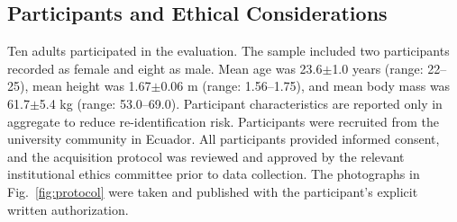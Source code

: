 \documentclass[conference]{IEEEtran}
\newcommand{\CC}[1]{\textcolor{blue}{#1}}
\begin{document}
\begin{table}[t]
\caption{\CC{Controlled posture acquisition protocol (35~s nominal)}}
\label{tab:protocol_ieee}
\centering
\scriptsize
\renewcommand{\arraystretch}{1.18}
\end{table}

\subsection{Participants and Ethical Considerations}
Ten adults participated in the evaluation. The sample included two participants recorded as female and eight as male. Mean age was 23.6$\pm$1.0 years (range: 22--25), mean height was 1.67$\pm$0.06 m (range: 1.56--1.75), and mean body mass was 61.7$\pm$5.4 kg (range: 53.0--69.0). Participant characteristics are reported only in aggregate to reduce re-identification risk. Participants were recruited from the university community in Ecuador. All participants provided informed consent, and the acquisition protocol was reviewed and approved by the relevant institutional ethics committee prior to data collection. The photographs in Fig.~\ref{fig:protocol} were taken and published with the participant's explicit written authorization.
\end{document}
